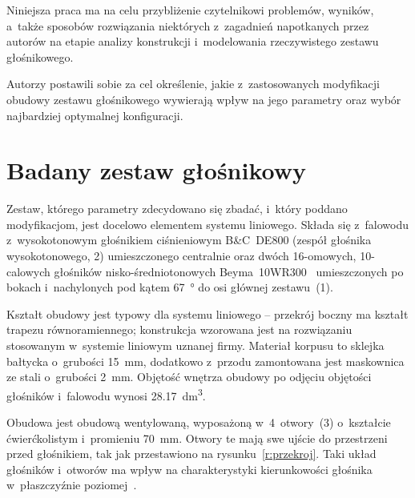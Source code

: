 \documentclass[12pt]{oska}
\newcommand{\comment}[1]{{\color{magenta}\emph{\textbf{#1}}}}
\begin{document}
	Niniejsza praca ma na celu przybliżenie czytelnikowi problemów, wyników, a~także sposobów rozwiązania niektórych z~zagadnień napotkanych przez autorów na etapie analizy konstrukcji i~modelowania rzeczywistego zestawu głośnikowego.
	
	Autorzy postawili sobie za cel określenie, jakie z~zastosowanych modyfikacji obudowy zestawu głośnikowego wywierają wpływ na jego parametry oraz wybór najbardziej optymalnej konfiguracji.
	
	
	
	\section{Badany zestaw głośnikowy}\label{ss:opis}
	
	
	Zestaw, którego parametry zdecydowano się zbadać, i~który poddano modyfikacjom, jest docelowo elementem systemu liniowego. Składa się z~falowodu z~wysokotonowym głośnikiem ciśnieniowym B\&C~DE800 (zespół głośnika wysokotonowego, 2) umieszczonego centralnie oraz dwóch 16-omowych, 10-calowych głośników nisko-średniotonowych Beyma~10WR300~\cite{datasheet} umieszczonych po bokach i~nachylonych pod kątem \SI{67}{\degree} do osi głównej zestawu~(1).
	
	Kształt obudowy jest typowy dla systemu liniowego -- przekrój boczny ma kształt trapezu równoramiennego; konstrukcja wzorowana jest na rozwiązaniu stosowanym w~systemie liniowym uznanej firmy. Materiał korpusu to sklejka bałtycka o~grubości \SI{15}{\milli\metre}, dodatkowo z~przodu zamontowana jest maskownica ze stali o~grubości \SI{2}{\milli\metre}. Objętość wnętrza obudowy po odjęciu objętości głośników i~falowodu wynosi \SI{28,17}{\deci\metre\cubed}.
	
	Obudowa jest obudową wentylowaną, wyposażoną w~4~otwory~(3) o~kształcie ćwierćkolistym i~promieniu \SI{70}{\milli\metre}. Otwory te mają swe ujście do przestrzeni przed głośnikiem, tak jak przestawiono na rysunku~\ref{r:przekroj}. %
	Taki układ głośników i~otworów ma wpływ na charakterystyki kierunkowości głośnika w~płaszczyźnie poziomej~\cite{kmiecik_inz}. %
	
\end{document}
